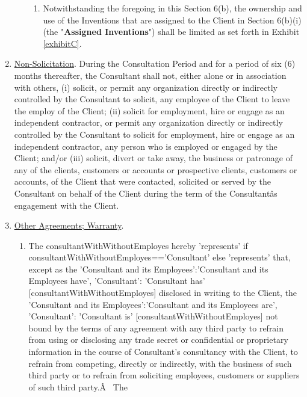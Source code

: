 \documentclass[12pt]{article}
\newcommand{\VAR}[1]{{\color{blue}#1}}
\begin{document}
\begin{enumerate}
\begin{enumerate}
\begin{enumerate}[(1)]
            \item Notwithstanding the foregoing in this Section 6(b), the ownership and use of the Inventions that are assigned to the Client in Section 6(b)(i) (the "{\bf Assigned Inventions}") shall be limited as set forth in Exhibit \ref{exhibitC}.
        \end{enumerate}
    \end{enumerate}
    \item \underline{Non-Solicitation}.
    During the Consultation Period and for a period of six (6) months thereafter, the Consultant shall not, either alone or in association with others, (i) solicit, or permit any organization directly or indirectly controlled by the Consultant to solicit, any employee of the Client to leave the employ of the Client; (ii) solicit for employment, hire or engage as an independent contractor, or permit any organization directly or indirectly controlled by the Consultant to solicit for employment, hire or engage as an independent contractor, any person who is employed or engaged by the Client; and/or (iii) solicit, divert or take away, the business or patronage of any of the clients, customers or accounts or prospective clients, customers or accounts, of the Client that were contacted, solicited or served by the Consultant on behalf of the Client during the term of the Consultantâs engagement with the Client.
    \item \underline{Other Agreements; Warranty}.
    \begin{enumerate}
        \item The \VAR{ consultantWithWithoutEmployes } hereby
        \VAR{ 'represents' if consultantWithWithoutEmployes=='Consultant' else 'represents'}
        that, except as the
        \VAR{
            {
                'Consultant and its Employees':'Consultant and its Employees have',
                'Consultant': 'Consultant has'
            }[consultantWithWithoutEmployes]
        }
        disclosed in writing to the Client, the
        \VAR{
            {
                'Consultant and its Employees':'Consultant and its Employees are',
                'Consultant': 'Consultant is'
            }[consultantWithWithoutEmployes]
        }
        not bound by the terms of any agreement with any third party to refrain from using or disclosing any trade secret or confidential or proprietary information in the course of Consultant's consultancy with the Client, to refrain from competing, directly or indirectly, with the business of such third party or to refrain from soliciting employees, customers or suppliers of such third party.Â  The

\end{enumerate}
\end{enumerate}
\end{document}
